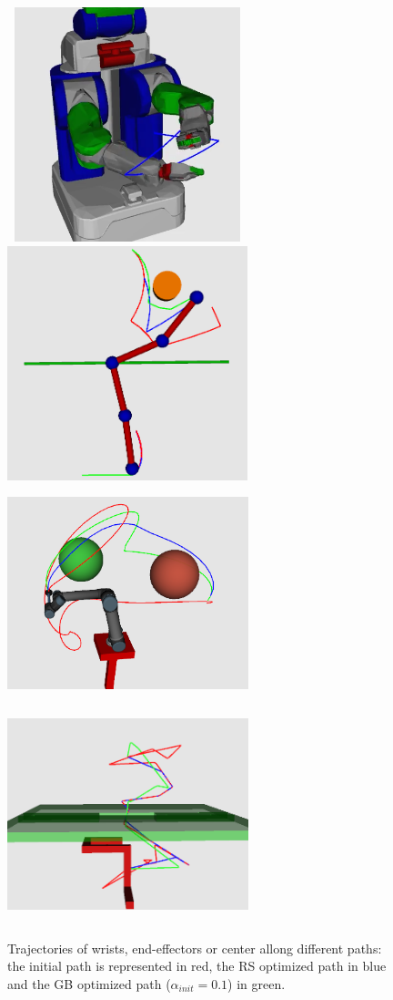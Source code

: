 \documentclass{tADR2e}
\begin{document}
\begin{figure}[t]
	\centering
	\includegraphics[width=7.0cm,height=6.8cm]{pr2_orth_constr_results.png}
	\includegraphics[width=7.0cm,height=6.8cm]{ur2_orth_constr_results.png}\\
	\vspace{0.05cm}
	\includegraphics[width=7.0cm,height=6.3cm]{ur5sph_orth_constr_results.png}
	\includegraphics[width=7.0cm,height=6.3cm]{puzzle_orth_constr_results.png}
	\caption{Trajectories of wrists, end-effectors or center allong different paths: the initial path is represented in red, the RS optimized path in blue and the GB optimized path ($\alpha_{init}=0.1$) in green.}
	\label{trajectories}
\end{figure}
\end{document}
